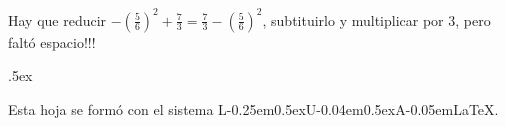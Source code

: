 \documentclass[12pt,letterpaper]{article}
\newcommand{\fej}{\relax\hfill\ifmmode{\lower.5ex\hbox{{\textcolor{blue}{\LARGE\smiley al 15pt}}}}\else\lower.5ex\hbox{{\textcolor{blue}{\LARGE \smiley}}}}  %
\newcommand{\LuaLaTeX}{L\kern-0.25em\raise0.5ex\hbox{\tiny U}\kern-0.04em\raise0.5ex\hbox{\tiny A}\kern-0.05em\LaTeX}
\begin{document}
Hay que reducir $-\left(\frac{5}{6}\right)^2+\frac{7}{3}=\frac{7}{3} -\left(\frac{5}{6}\right)^2$, subtituirlo y multiplicar por $3$, pero faltó espacio!!!




\fej






\smallskip






\vfill 



\begin{center}
	{\footnotesize\color{olive} Esta hoja se formó con el sistema \LuaLaTeX.}
\end{center}
\end{document}
